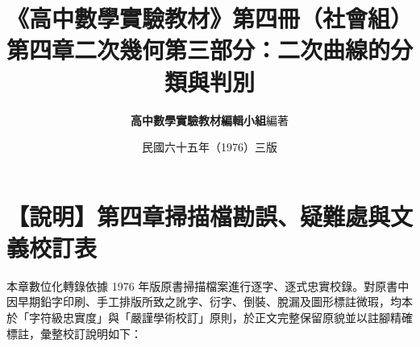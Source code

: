 \documentclass[a4paper,12pt,twoside]{article}
\title{\LARGE\textbf{《高中數學實驗教材》第四冊（社會組）}\\[0.5em] \Large\textbf{第四章\quad 二次幾何\quad 第三部分：二次曲線的分類與判別}}
\author{\textbf{高中數學實驗教材編輯小組}\quad 編著}
\date{民國六十五年（1976）三版}
\begin{document}
\maketitle
\thispagestyle{firstpage}

\section*{【說明】第四章掃描檔勘誤、疑難處與文義校訂表}

本章數位化轉錄依據 1976 年版原書掃描檔案進行逐字、逐式忠實校錄。對原書中因早期鉛字印刷、手工排版所致之訛字、衍字、倒裝、脫漏及圖形標註微瑕，均本於「字符級忠實度」與「嚴謹學術校訂」原則，於正文完整保留原貌並以註腳精確標註，彙整校訂說明如下：
\end{document}
